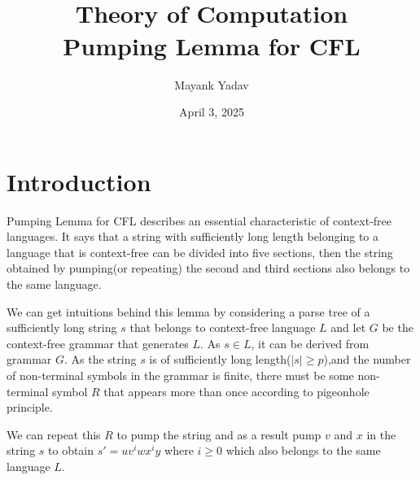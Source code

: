 \documentclass{article}
\title{\\  \large Theory of Computation \\ \LARGE   Pumping Lemma for CFL}
\author{Mayank Yadav}
\date{April 3, 2025}
\begin{document}
\maketitle


\section{Introduction}
Pumping Lemma for CFL describes an essential characteristic of context-free languages. It says that a string with sufficiently long length belonging to a language that is context-free can be divided into five sections, then the string obtained by pumping(or repeating) the second and third sections also belongs to the same language.

\begin{center}
\end{center}

We can get intuitions behind this lemma by considering a parse tree of a sufficiently long string $s$ that belongs to context-free language $L$ and let $G$ be the context-free grammar that generates $L$. As $s\in L$, it can be derived from grammar $G$. As the string $s$ is of sufficiently long length($\mid s\mid \ge p$),and the number of non-terminal symbols in the grammar is finite, there must be some non-terminal symbol $R$ that appears more than once according to pigeonhole principle. 

We can repeat this $R$ to pump the string and as a result pump $v$ and $x$ in the string $s$ to obtain $s'=uv^iwx^iy$ where $i\ge 0$ which also belongs to the same language $L$.
\end{document}
